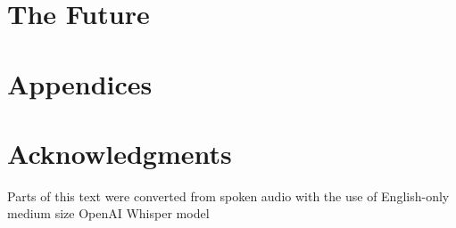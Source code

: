\newpage
\chapter{The Future} \label{ch:future}

\newpage
\chapter{Appendices}

\newpage
\chapter{Acknowledgments}

Parts of this text were converted from spoken audio with the use of English-only medium size OpenAI Whisper model \cite{radfordRobustSpeechRecognition2022}

\printbibliography


